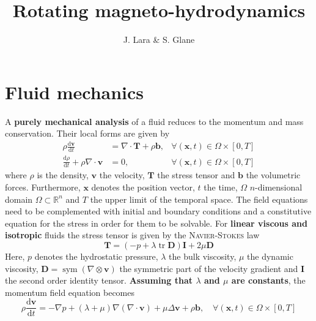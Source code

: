 \documentclass[]{scrartcl}
\title{Rotating magneto-hydrodynamics}
\author{J. Lara \& S. Glane}
\newcommand{\tdfrac}[2]{\frac{\mathrm{d} #1}{\mathrm{d} #2}}
\newcommand{\bs}[1]{\boldsymbol{#1}}
\DeclareMathOperator{\Spur}{tr}
\DeclareMathOperator{\Sym}{sym}
\begin{document}
\maketitle

\begin{abstract}

\end{abstract}

\section{Fluid mechanics}\label{Sec:FluidMechanics}
A \textbf{purely mechanical analysis} of a fluid reduces to the momentum and mass conservation. Their local forms are given by
\begin{subequations}\label{Eqn:FieldEqutaions}
	\begin{align}
		\label{Eqn:LinearMomemntum}
		\rho \tdfrac{\bs{v}}{t} &= \nabla \cdot \bs{T} + \rho \bs{b}, &\forall (\bs{x}, t) \in \Omega \times \left[0, T \right] \\
		\label{Eqn:MassConservation}
		\tdfrac{\rho}{t} + \rho \nabla \cdot \bs{v}&= 0, &\forall (\bs{x}, t) \in \Omega \times  \left[0, T \right]
	\end{align}
\end{subequations} 
where $\rho$ is the density, $\bs{v}$ the velocity, $\bs{T}$ the stress tensor and $\bs{b}$ the volumetric forces. Furthermore, $\bs{x}$ denotes the position vector, $t$ the time, $\Omega$  $n$-dimensional domain $\Omega \subset \mathbb{R}^n$ and $T$ the upper limit of the temporal space. The field equations need to be complemented with initial and boundary conditions and a constitutive equation for the stress in order for them to be solvable. For \textbf{linear viscous and isotropic} fluids the stress tensor is given by the \textsc{Navier-Stokes} law
\begin{equation*}
	\bs{T} = (-p + \lambda \Spur \bs{D}) \bs{I} + 2 \mu \bs{D}
\end{equation*}
Here, $p$ denotes the hydrostatic pressure, $\lambda$ the bulk viscosity, $\mu$ the dynamic viscosity, $\bs{D} = \Sym (\nabla \otimes \bs{v})$ the symmetric part of the velocity gradient and $\bs{I}$ the second order identity tensor. \textbf{Assuming that $\lambda$ and $\mu$ are constants}, the momentum field equation becomes
\begin{equation*}
\rho \tdfrac{\bs{v}}{t} = -\nabla p + (\lambda + \mu) \nabla (\nabla \cdot \bs{v}) + \mu \Delta \bs{v} + \rho\bs{b}, \quad \forall (\bs{x}, t) \in \Omega \times \left[0, T \right]
\end{equation*}
\end{document}
